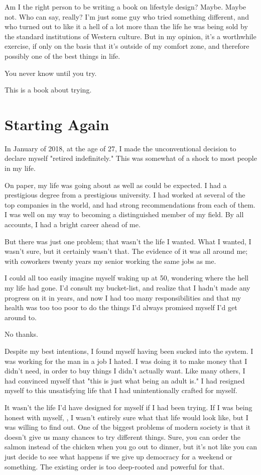 \documentclass[]{book}
\begin{document}
Am I the right person to be writing a book on lifestyle design? Maybe. Maybe
not. Who can say, really? I'm just some guy who tried something different, and
who turned out to like it a hell of a lot more than the life he was being sold
by the standard institutions of Western culture. But in my opinion, it's a
worthwhile exercise, if only on the basis that it's outside of my comfort zone,
and therefore possibly one of the best things in life.

You never know until you try.

This is a book about trying.


\chapter{Starting Again}

In January of 2018, at the age of 27, I made the unconventional decision to
declare myself "retired indefinitely." This was somewhat of a shock to most
people in my life.

On paper, my life was going about as well as could be expected. I had a
prestigious degree from a prestigious university. I had worked at several of the
top companies in the world, and had strong recommendations from each of them. I
was well on my way to becoming a distinguished member of my field. By all
accounts, I had a bright career ahead of me.

But there was just one problem; that wasn't the life I wanted. What I wanted, I
wasn't sure, but it certainly wasn't that. The evidence of it was all around me;
with coworkers twenty years my senior working the same jobs as me.

I could all too easily imagine myself waking up at 50, wondering where the hell
my life had gone. I'd consult my bucket-list, and realize that I hadn't made any
progress on it in years, and now I had too many responsibilities and that my
health was too too poor to do the things I'd always promised myself I'd get
around to.

No thanks.

Despite my best intentions, I found myself having been sucked into the system. I
was working for the man in a job I hated. I was doing it to make money that I
didn't need, in order to buy things I didn't actually want. Like many others, I
had convinced myself that "this is just what being an adult is." I had resigned
myself to this unsatisfying life that I had unintentionally crafted for myself.

It wasn't the life I'd have designed for myself if I had been trying. If I was
being honest with myself, , I wasn't entirely sure what that life would look
like, but I was willing to find out. One of the biggest problems of modern
society is that it doesn't give us many chances to try different things. Sure,
you can order the salmon instead of the chicken when you go out to dinner, but
it's not like you can just decide to see what happens if we give up democracy
for a weekend or something.  The existing order is too deep-rooted and powerful
for that.
\end{document}
